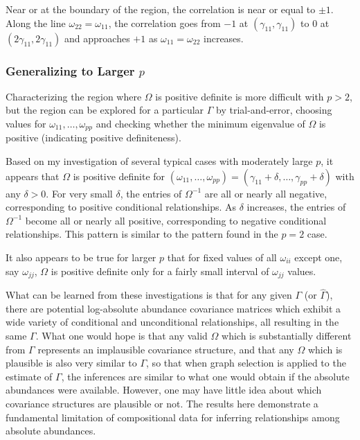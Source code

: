 \documentclass[10pt]{article}
\begin{document}
Near or at the boundary of the region, the correlation is near or equal to $\pm 1$. Along the line $\omega_{22} = \omega_{11}$, the correlation goes from $-1$ at $(\gamma_{11}, \gamma_{11})$ to 0 at $(2\gamma_{11}, 2\gamma_{11})$ and approaches $+1$ as $\omega_{11} = \omega_{22}$ increases.

\subsubsection*{Generalizing to Larger $p$}

Characterizing the region where $\Omega$ is positive definite is more difficult with $p > 2$, but the region can be explored for a particular $\Gamma$ by trial-and-error, choosing values for $\omega_{11}, \dots, \omega_{pp}$ and checking whether the minimum eigenvalue of $\Omega$ is positive (indicating positive definiteness).

Based on my investigation of several typical cases with moderately large $p$, it appears that $\Omega$ is positive definite for $(\omega_{11}, \dots, \omega_{pp}) = (\gamma_{11} + \delta, \dots, \gamma_{pp} + \delta)$ with any $\delta > 0$. For very small $\delta$, the entries of $\Omega^{-1}$ are all or nearly all negative, corresponding to positive conditional relationships. As $\delta$ increases, the entries of $\Omega^{-1}$ become all or nearly all positive, corresponding to negative conditional relationships. This pattern is similar to the pattern found in the $p = 2$ case.

It also appears to be true for larger $p$ that for fixed values of all $\omega_{ii}$ except one, say $\omega_{jj}$, $\Omega$ is positive definite only for a fairly small interval of $\omega_{jj}$ values.

What can be learned from these investigations is that for any given $\Gamma$ (or $\hat{\Gamma}$), there are potential log-absolute abundance covariance matrices which exhibit a wide variety of conditional and unconditional relationships, all resulting in the same $\Gamma$. What one would hope is that any valid $\Omega$ which is substantially different from $\Gamma$ represents an implausible covariance structure, and that any $\Omega$ which is plausible is also very similar to $\Gamma$, so that when graph selection is applied to the estimate of $\Gamma$, the inferences are similar to what one would obtain if the absolute abundances were available. However, one may have little idea about which covariance structures are plausible or not. The results here demonstrate a fundamental limitation of compositional data for inferring relationships among absolute abundances.
\end{document}

